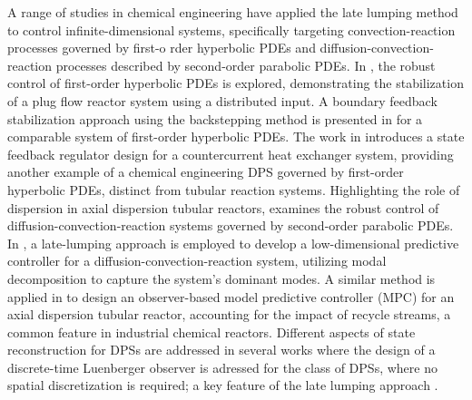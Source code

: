 A range of studies in chemical engineering have applied the late lumping method to control infinite-dimensional systems, specifically targeting convection-reaction processes governed by first-o                                          rder hyperbolic PDEs and diffusion-convection-reaction processes described by second-order parabolic PDEs. 
In \cite{christofides1996feedback}, the robust control of first-order hyperbolic PDEs is explored, demonstrating the stabilization of a plug flow reactor system using a distributed input. 
A boundary feedback stabilization approach using the backstepping method is presented in \cite{krstic2008backstepping} for a comparable system of first-order hyperbolic PDEs. 
The work in \cite{xu2016state} introduces a state feedback regulator design for a countercurrent heat exchanger system, providing another example of a chemical engineering DPS governed by first-order hyperbolic PDEs, distinct from tubular reaction systems. 
Highlighting the role of dispersion in axial dispersion tubular reactors, \cite{christofides1998robust} examines the robust control of diffusion-convection-reaction systems governed by second-order parabolic PDEs. 
In \cite{dubljevic2006predictive2}, a late-lumping approach is employed to develop a low-dimensional predictive controller for a diffusion-convection-reaction system, utilizing modal decomposition to capture the system's dominant modes. 
A similar method is applied in \cite{khatibi2021model} to design an observer-based model predictive controller (MPC) for an axial dispersion tubular reactor, accounting for the impact of recycle streams, a common feature in industrial chemical reactors. 
Different aspects of state reconstruction for DPSs are addressed in several works where the design of a discrete-time Luenberger observer is adressed for the class of DPSs, where no spatial discretization is required; a key feature of the late lumping approach  \cite{dochain2000state, dochain2001state, alonso2004optimal, ali2015review}.


